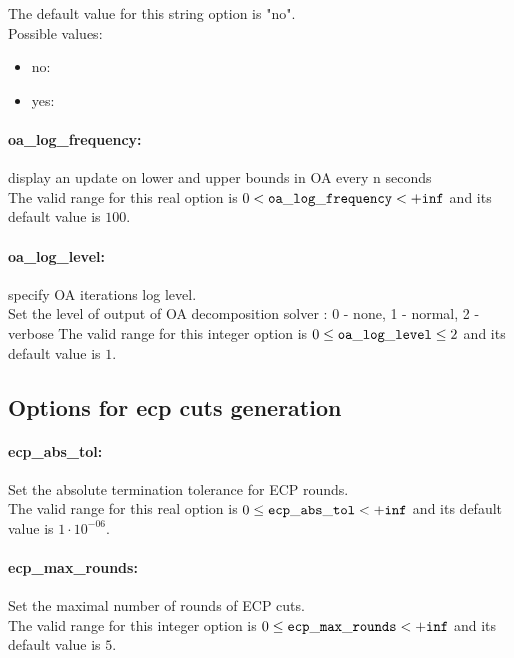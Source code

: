 The default value for this string option is "no".
\\ 
Possible values:
\begin{itemize}
   \item no: 
   \item yes: 
\end{itemize}

\paragraph{oa\_log\_frequency:}\label{sec:oa_log_frequency} display an update on lower and upper bounds in OA every n seconds $\;$ \\
 The valid range for this real option is 
$0 <  {\tt oa\_log\_frequency } <  {\tt +inf}$
and its default value is $100$.


\paragraph{oa\_log\_level:}\label{sec:oa_log_level} specify OA iterations log level. $\;$ \\
 Set the level of output of OA decomposition
solver : 0 - none, 1 - normal, 2 - verbose The valid range for this integer option is
$0 \le {\tt oa\_log\_level } \le 2$
and its default value is $1$.


\subsection{Options for ecp cuts generation}
\label{sec:Options_for_ecp_cuts_generation}
\paragraph{ecp\_abs\_tol:}\label{sec:ecp_abs_tol} Set the absolute termination tolerance for ECP rounds. $\;$ \\
 The valid range for this real option is 
$0 \le {\tt ecp\_abs\_tol } <  {\tt +inf}$
and its default value is $1 \cdot 10^{-06}$.


\paragraph{ecp\_max\_rounds:}\label{sec:ecp_max_rounds} Set the maximal number of rounds of ECP cuts. $\;$ \\
 The valid range for this integer option is
$0 \le {\tt ecp\_max\_rounds } <  {\tt +inf}$
and its default value is $5$.


